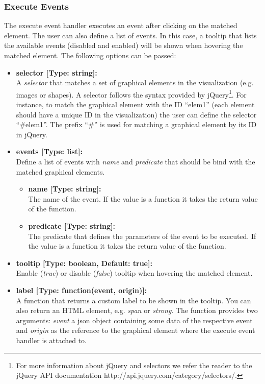 \subsubsection{Execute Events}

The execute event handler executes an event after clicking on the matched element.
The user can also define a list of events.
In this case, a tooltip that lists the available events (disabled and enabled) will be shown when hovering the matched element.
The following options can be passed:

\begin{itemize}

\item[] \textbf{selector [Type: string]:}\\ A \textit{selector} that matches a set of graphical elements in the visualization (e.g. images or shapes). 
A selector follows the syntax provided by jQuery\footnote{For more information about jQuery and selectors we refer the reader to the jQuery
API documentation http://api.jquery.com/category/selectors/.}. 
For instance, to match the graphical element with the ID ``elem1'' (each element should have a unique ID in the visualization) the user can define the selector ``\#elem1''.
The prefix ``\#'' is used for matching a graphical element by its ID in jQuery.

\item[] \textbf{events [Type: list]:}\\
Define a list of events with \textit{name} and \textit{predicate} that should be bind with the matched graphical elements.

\begin{itemize}

\item[] \textbf{name [Type: string]:}\\
The name of the event. 
If the value is a function it takes the return value of the function.

\item[] \textbf{predicate [Type: string]:}\\
The predicate that defines the parameters of the event to be executed.
If the value is a function it takes the return value of the function.

\end{itemize}

\item[] \textbf{tooltip [Type: boolean, Default: true]:}\\
 Enable (\textit{true}) or disable (\textit{false}) tooltip when hovering the matched element.

\item[] \textbf{label [Type: function(event, origin)]:}\\
A function that returns a custom label to be shown in the tooltip.
You can also return an HTML element, e.g. \textit{span} or \textit{strong}.
 The function provides two arguments: \textit{event} a json object containing some data of the respective event and \textit{origin} as the reference to the graphical element where the execute event handler is attached to.
	
\end{itemize}

